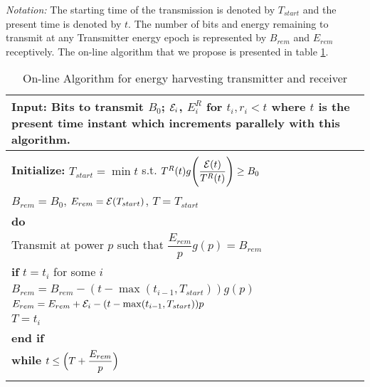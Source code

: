 \textit{Notation:} The starting time of the transmission is denoted by $T_{start}$ and the present time is denoted by $t$. The number of bits and energy remaining to transmit at any Transmitter energy epoch is represented by $B_{rem}$ and $E_{rem}$ receptively.
The on-line algorithm that we propose is presented in table \ref{online}.
\begin{table}
\begin{minipage}[b]{8cm}
\caption {On-line Algorithm for energy harvesting transmitter and receiver}
\begin{tabular}{p{7cm}}
\hline \textbf{Input}: Bits to transmit $B_0$; $\mathcal{E}_i$, $E^R_i$ for $t_i,r_i<t$ where $t$ is the present time instant which increments parallely with this algorithm. 
\\
\hline
\\
\textbf{Initialize:} $T_{start}=\min t$ s.t. $T^R(t)g\Bigg{(} \dfrac{\mathcal{E}(t)}{T^R(t)}\Bigg{)}\ge B_0$
\\
\hspace{12mm}$B_{rem}=B_0$, $E_{rem}=\mathcal{E}(T_{start})$, $T=T_{start}$
\\
\textbf{do}
\\
\hspace{4mm} Transmit at power $p$ such that $\dfrac{E_{rem}}{p} g(p)= B_{rem}$
\\
\hspace{4mm} \textbf{if} $t=t_i$ for some $i$ 
\\
\hspace{7mm} $B_{rem}=B_{rem}-(t-\max (t_{i-1},T_{start}))g(p)$
\\
\hspace{7mm} $E_{rem}=E_{rem}+\mathcal{E}_i-(t-\max (t_{i-1},T_{start}))p$
\\
\hspace{7mm} $T=t_i$
\\
\hspace{4mm} \textbf{end if}
\\
\textbf{while} $t\le \Big{(}T+\dfrac{E_{rem}}{p}\Big{)}$
\\
\hline
\label{online}
\end{tabular}
\end{minipage}
\end{table}

